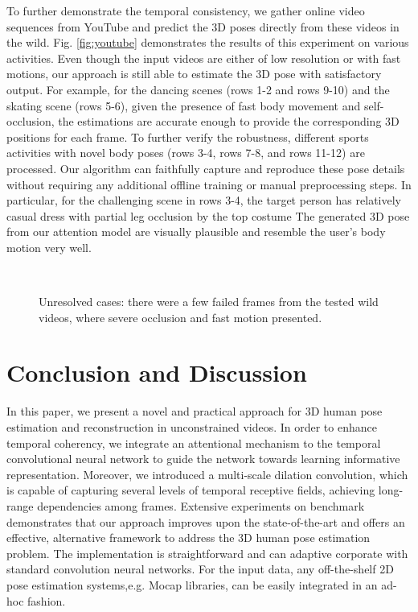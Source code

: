 \documentclass[twocolumn]{svjour3}          \smartqed  \usepackage{graphicx}
\begin{document}
To further demonstrate the temporal consistency, we gather online video sequences from YouTube and predict the 3D poses directly from these videos in the wild. Fig. \ref{fig:youtube} demonstrates the results of this experiment on various activities. Even though the input videos are either of low resolution or with fast motions, our approach is still able to estimate the 3D pose with satisfactory output. For example, for the dancing scenes (rows 1-2 and rows 9-10) and the skating scene (rows 5-6), given the presence of fast body movement and self-occlusion, the estimations are accurate enough to provide the corresponding 3D positions for each frame. To further verify the robustness, different sports activities with novel body poses (rows 3-4, rows 7-8, and rows 11-12) are processed. Our algorithm can faithfully capture and reproduce these pose details without requiring any additional offline training or manual preprocessing steps. In particular, for the challenging scene in rows 3-4, the target person has relatively casual dress with partial leg occlusion by the top costume The generated 3D pose from our attention model are visually plausible and resemble the user’s body motion very well.





\begin{figure}[]
\centering
{}\\
\caption{Unresolved cases: there were a few failed frames from the tested wild videos, where severe occlusion and fast motion presented.}
\label{limitations}
\end{figure}

\section{Conclusion and Discussion}
In this paper, we present a novel and practical approach for 3D human pose estimation and reconstruction in unconstrained videos. In order to enhance temporal coherency, we integrate an attentional mechanism to the temporal convolutional neural network to guide the network towards learning informative representation. Moreover, we introduced a multi-scale dilation convolution, which is capable of capturing several levels of temporal receptive fields, achieving long-range dependencies among frames. Extensive experiments on benchmark  demonstrates that our approach improves upon the state-of-the-art and offers an effective, alternative framework to
address the 3D human pose estimation problem. The implementation is straightforward and can  adaptive corporate with standard convolution neural networks. For the input data, any off-the-shelf  2D  pose  estimation  systems,e.g. Mocap libraries, can be easily integrated in an ad-hoc fashion. 
\end{document}
